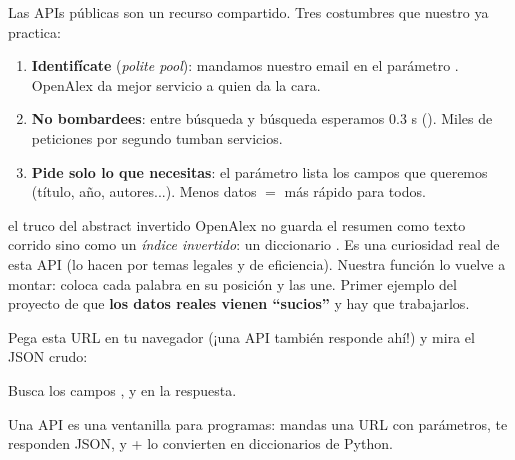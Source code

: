 \documentclass[11pt,a4paper]{article}
\begin{document}
Las APIs públicas son un recurso compartido. Tres costumbres que nuestro 
ya practica:

\begin{enumerate}
  \item \textbf{Identifícate} (\emph{polite pool}): mandamos nuestro email en el parámetro
        . OpenAlex da mejor servicio a quien da la cara.
  \item \textbf{No bombardees}: entre búsqueda y búsqueda esperamos 0.3 s
        (). Miles de peticiones por segundo tumban servicios.
  \item \textbf{Pide solo lo que necesitas}: el parámetro  lista los campos
        que queremos (título, año, autores...). Menos datos $=$ más rápido para todos.
\end{enumerate}

\begin{concepto}{el truco del abstract invertido}
OpenAlex no guarda el resumen como texto corrido sino como un \emph{índice invertido}:
un diccionario . Es una curiosidad real de
esta API (lo hacen por temas legales y de eficiencia). Nuestra función
 lo vuelve a montar: coloca cada palabra en su posición
y las une. Primer ejemplo del proyecto de que \textbf{los datos reales vienen ``sucios''}
y hay que trabajarlos.
\end{concepto}

\begin{practica}
Pega esta URL en tu navegador (¡una API también responde ahí!) y mira el JSON crudo:
\begin{center}
\small{}
\end{center}
Busca los campos ,  y
 en la respuesta.
\end{practica}

\begin{resumen}
Una API es una ventanilla para programas: mandas una URL con parámetros, te responden
JSON, y  +  lo convierten en diccionarios de Python.
\end{resumen}
\clearpage
{}
{}
\end{document}
